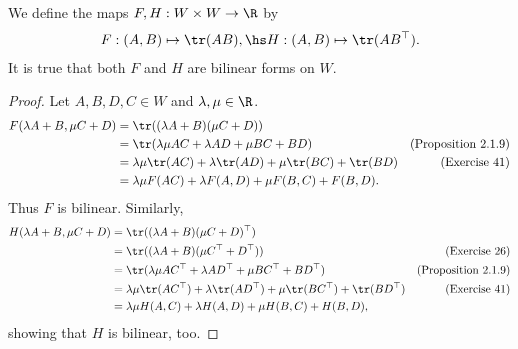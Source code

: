\documentclass{article}
\begin{document}
\begin{claim*}[1b]
	We define the maps $F,H:W\times W\to\R$ by
	\begin{align*}
		F:(A,B)\mapsto \tr(AB),\hs H:(A,B)\mapsto \tr(AB^\top).
	\end{align*}
	It is true that both $F$ and $H$ are bilinear forms on $W$.
	\begin{proof}
		Let $A,B,D,C\in W$ and $\lambda,\mu\in\R$.
		\begin{align*}
			F(\lambda A+B,\mu C + D) & =\tr((\lambda A+B)(\mu C+D))                                                            \\
			                         & =\tr(\lambda\mu AC + \lambda AD + \mu BC + BD)             & \text{(Proposition 2.1.9)} \\
			                         & =\lambda\mu\tr (AC) + \lambda\tr(AD) +\mu\tr(BC) + \tr(BD) & \text{(Exercise 41)}       \\
			                         & = \lambda\mu F(AC)+ \lambda F(A,D) + \mu F(B,C) + F(B,D).
		\end{align*}
		Thus $F$ is bilinear. Similarly,
		\begin{align*}
			H(\lambda A+B,\mu C + D) & =\tr((\lambda A+B)(\mu C+D)^\top)                                                                           \\
			                         & =\tr((\lambda A+B)(\mu C^\top + D^\top))                                       & \text{(Exercise 26)}       \\
			                         & =\tr(\lambda\mu AC^\top + \lambda AD^\top + \mu BC^\top + BD^\top)             & \text{(Proposition 2.1.9)} \\
			                         & =\lambda\mu\tr (AC^\top) + \lambda\tr(AD^\top) +\mu\tr(BC^\top) + \tr(BD^\top) & \text{(Exercise 41)}       \\
			                         & = \lambda\mu H(A,C)+ \lambda H(A,D) + \mu H(B,C) + H(B,D),
		\end{align*}
		showing that $H$ is bilinear, too.
	\end{proof}
\end{claim*}
\end{document}
